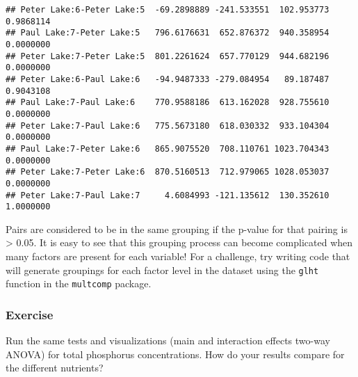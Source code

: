 \documentclass[]{article}
\begin{document}
\begin{verbatim}
## Peter Lake:6-Peter Lake:5  -69.2898889 -241.533551  102.953773 0.9868114
## Paul Lake:7-Peter Lake:5   796.6176631  652.876372  940.358954 0.0000000
## Peter Lake:7-Peter Lake:5  801.2261624  657.770129  944.682196 0.0000000
## Peter Lake:6-Paul Lake:6   -94.9487333 -279.084954   89.187487 0.9043108
## Paul Lake:7-Paul Lake:6    770.9588186  613.162028  928.755610 0.0000000
## Peter Lake:7-Paul Lake:6   775.5673180  618.030332  933.104304 0.0000000
## Paul Lake:7-Peter Lake:6   865.9075520  708.110761 1023.704343 0.0000000
## Peter Lake:7-Peter Lake:6  870.5160513  712.979065 1028.053037 0.0000000
## Peter Lake:7-Paul Lake:7     4.6084993 -121.135612  130.352610 1.0000000
\end{verbatim}

Pairs are considered to be in the same grouping if the p-value for that
pairing is \textgreater{} 0.05. It is easy to see that this grouping
process can become complicated when many factors are present for each
variable! For a challenge, try writing code that will generate groupings
for each factor level in the dataset using the \texttt{glht} function in
the \texttt{multcomp} package.

\subsubsection{Exercise}\label{exercise}

Run the same tests and visualizations (main and interaction effects
two-way ANOVA) for total phosphorus concentrations. How do your results
compare for the different nutrients?
\end{document}
